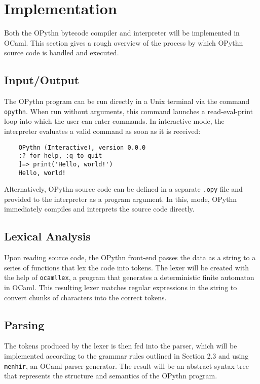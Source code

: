 \documentclass[11pt, twoside]{article}
\begin{document}
\section{Implementation}
Both the OPythn bytecode compiler and interpreter will be implemented in OCaml. This section gives a rough overview of the process by which OPythn source code is handled and executed.
    \subsection{Input/Output}
    The OPythn program can be run directly in a Unix terminal via the command \texttt{opythn}. When run without arguments, this command launches a read-eval-print loop into which the user can enter commands. In interactive mode, the interpreter evaluates a valid command as soon as it is received:
    \begin{lstlisting}
    OPythn (Interactive), version 0.0.0
    :? for help, :q to quit
    ]=> print('Hello, world!')
    Hello, world!
    \end{lstlisting}
    Alternatively, OPythn source code can be defined in a separate \texttt{.opy} file and provided to the interpreter as a program argument. In this, mode, OPythn immediately compiles and interprets the source code directly.
    \subsection{Lexical Analysis}
    Upon reading source code, the OPythn front-end passes the data as a string to a series of functions that lex the code into tokens. The lexer will be created with the help of \texttt{ocamllex}, a program that generates a deterministic finite automaton in OCaml. This resulting lexer matches regular expressions in the string to convert chunks of characters into the correct tokens. 
    \subsection{Parsing}
    The tokens produced by the lexer is then fed into the parser, which will be implemented according to the grammar rules outlined in Section 2.3 and using \texttt{menhir}, an OCaml parser generator. The result will be an abstract syntax tree that represents the structure and semantics of the OPythn program. 
\end{document}
